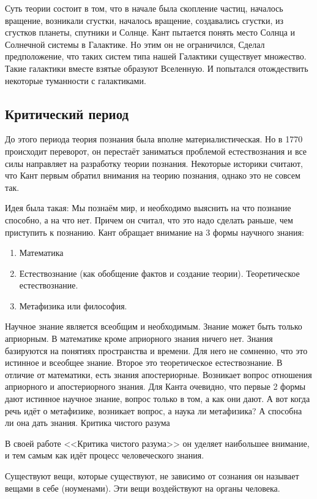 Суть теории состоит в том, что в начале была скопление частиц, началось вращение, возникали сгустки, началось вращение, создавались сгустки, из сгустков планеты, спутники и Солнце. Кант пытается понять место Солнца и Солнечной системы в Галактике. Но этим он не ограничился, Сделал предположение, что таких систем типа нашей Галактики существует множество. Такие галактики вместе взятые образуют Вселенную. И попытался отождествить некоторые туманности с галактиками.

\subsection{Критический период}

До этого периода теория познания была вполне материалистическая. Но в 1770 происходит переворот, он перестаёт заниматься проблемой естествознания и все силы направляет на разработку теории познания. Некоторые историки считают, что Кант первым обратил внимания на теорию познания, однако это не совсем так.

Идея была такая: Мы познаём мир, и необходимо выяснить на что познание способно, а на что нет. Причем он считал, что это надо сделать раньше, чем приступить к познанию. Кант обращает внимание на 3 формы научного знания:
\begin{enumerate}
    \item Математика
    \item Естествознание (как обобщение фактов и создание теории). Теоретическое естествознание.
    \item Метафизика или философия.
\end{enumerate}
Научное знание является всеобщим и необходимым. Знание может быть только априорным. В математике кроме априорного знания ничего нет. Знания базируются на понятиях пространства и времени. Для него не сомненно, что это истинное и всеобщее знание. Второе это теоретическое естествознание. В отличие от математики, есть знания апостериорные. Возникает вопрос отношения априорного и апостериорного знания. Для Канта очевидно, что первые 2 формы дают истинное научное знание, вопрос только в том, а как они дают. А вот когда речь идёт о метафизике, возникает вопрос, а наука ли метафизика? А способна ли она дать знания.
Критика чистого разума

В своей работе <<Критика чистого разума>> он уделяет наибольшее внимание, и тем самым как идёт процесс человеческого знания.

    Существуют вещи, которые существуют, не зависимо от сознания он называет вещами в себе (ноуменами). Эти вещи воздействуют на органы человека.

